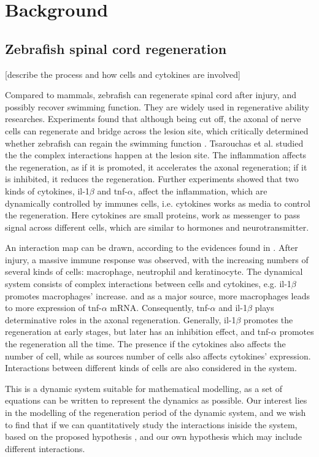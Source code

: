 \chapter{Background}

\section{Zebrafish spinal cord regeneration}

 [describe the process and how cells and cytokines are involved]

Compared to mammals, zebrafish can regenerate spinal cord after injury, and possibly recover swimming function. They are widely used in regenerative ability researches. Experiments found that although being cut off, the axonal of nerve cells can regenerate and bridge across the lesion site, which critically determined whether zebrafish can regain the swimming function \cite{axonal}. Tsarouchas et al. \cite{ref:Tsarouchas} studied the the complex interactions happen at the lesion site. The inflammation affects the regeneration, as if it is promoted, it accelerates the axonal regeneration; if it is inhibited, it reduces the regeneration. Further experiments showed that two kinds of cytokines, il-1$\beta$ and tnf-$\alpha$, affect the inflammation, which are dynamically controlled by immunes cells, i.e. cytokines works as media to control the regeneration. Here cytokines are small proteins, work as messenger to pass signal across different cells, which are similar to hormones and neurotransmitter.

An interaction map can be drawn, according to the evidences found in \cite{ref:Tsarouchas}. After injury, a massive immune response was observed, with the increasing numbers of several kinds of cells: macrophage, neutrophil and keratinocyte. The dynamical system consists of complex interactions between cells and cytokines, e.g. il-1$\beta$ promotes macrophages' increase. and as a major source, more macrophages leads to more expression of tnf-$\alpha$ mRNA. Consequently, tnf-$\alpha$ and il-1$\beta$ plays determinative roles in the axonal regeneration. Generally, il-1$\beta$ promotes the regeneration at early stages, but later has an inhibition effect, and tnf-$\alpha$ promotes the regeneration all the time. The presence if the cytokines also affects the number of cell, while as sources number of cells also affects cytokines' expression. Interactions between different kinds of cells are also considered in the system.

This is a dynamic system suitable for mathematical modelling, as a set of equations can be written to represent the dynamics as possible. Our interest lies in the modelling of the regeneration period of the dynamic system, and we wish to find that if we can quantitatively study the interactions iniside the system, based on the proposed hypothesis \cite{ref:Tsarouchas}, and our own hypothesis which may include different interactions.

